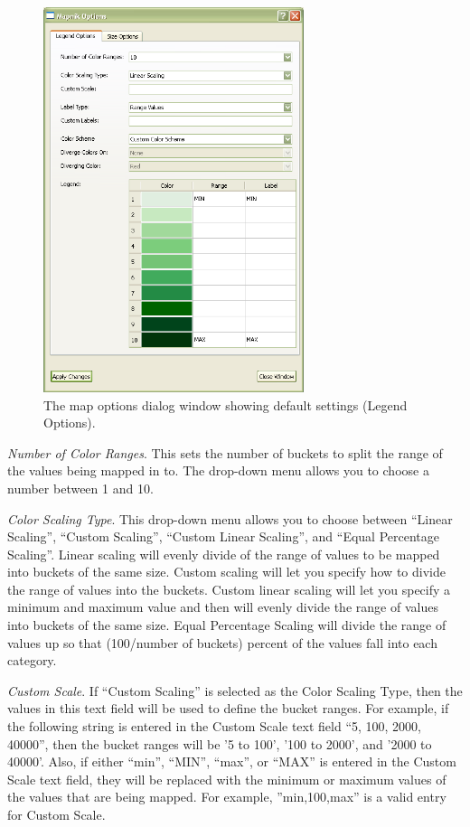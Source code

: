 \begin{figure}[h]
\begin{center}
\includegraphics[width=3in]{part-gui/images/result-manager-mapnik-options-dialog-legend.png}
\end{center}
\caption{The map options dialog window showing default settings (Legend Options).}
\label{fig:result-manager-mapnik-options-dialog-legend}
\end{figure}

\emph{Number of Color Ranges}. 
This sets the number of buckets to split the range of the values 
being mapped in to. The drop-down menu allows you to choose a 
number between 1 and 10.

\emph{Color Scaling Type}. 
This drop-down menu allows you to choose between ``Linear Scaling'',
 ``Custom Scaling'', ``Custom Linear Scaling'', and ``Equal Percentage
 Scaling''. Linear scaling will evenly divide of the 
range of values to be mapped into buckets of the same size.  
Custom scaling will let you specify how to divide the range of values 
into the buckets. Custom linear scaling will let you specify a minimum 
and maximum value and then will evenly divide the range of values into
buckets of the same size. Equal Percentage Scaling will divide the range of 
values up so that (100/number of buckets) percent of the values fall into each category. 


\emph{Custom Scale}. 
If ``Custom Scaling'' is selected as the Color Scaling Type, then 
the values in this text field will be used to define the bucket 
ranges. For example, if the following string is entered in 
the Custom Scale text field ``5, 100, 2000, 40000'', then the bucket 
ranges will be '5 to 100', '100 to 2000', and '2000 to 40000'.  
Also, if either ``min'', ``MIN'', ``max'', or ``MAX'' is entered in the 
Custom Scale text field, they will be replaced with the minimum 
or maximum values of the values that are being mapped. For example, 
''min,100,max'' is a valid entry for Custom Scale.

